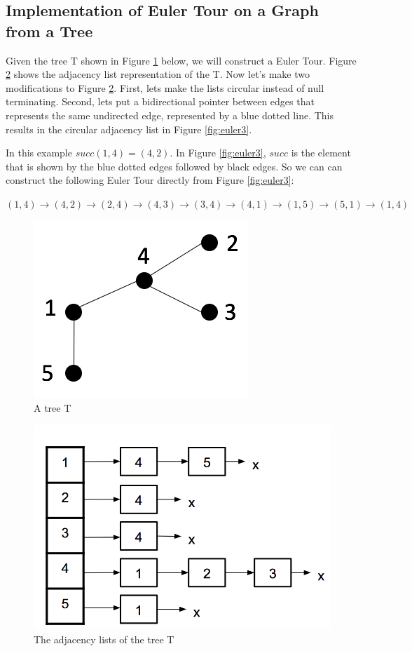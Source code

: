 \documentclass[twoside]{article}
\begin{document}
\subsection{Implementation of Euler Tour on a Graph from a Tree} 

Given the tree T shown in Figure \ref{fig:euler1} below, we will construct a Euler Tour.  Figure \ref{fig:euler2} shows the adjacency list representation of the T.  Now let's make two modifications to Figure \ref{fig:euler2}.  First, lets make the lists circular instead of null terminating.  Second, lets put a bidirectional pointer between edges that represents the same undirected edge, represented by a blue dotted line.  This results in the circular adjacency list in Figure \ref{fig:euler3}. 

In this example $succ(1,4) = (4,2)$.  In Figure \ref{fig:euler3}, $succ$ is the element that is shown by the blue dotted edges followed by black edges.  So we can can construct the following Euler Tour directly from Figure \ref{fig:euler3}:

$(1, 4) \rightarrow (4, 2) \rightarrow (2, 4) \rightarrow (4, 3) \rightarrow (3, 4) \rightarrow (4, 1) \rightarrow (1, 5) \rightarrow (5, 1) \rightarrow (1, 4)$

\begin{figure}[!ht]
\centering
\includegraphics[scale=0.6]{img/EulerCkt1.png}
\caption{A tree T} \label{fig:euler1} 
\end{figure}

\begin{figure}[!ht]
\centering
\includegraphics[scale=0.4]{img/EulerCkt2.png}
\caption{The adjacency lists of the tree T} \label{fig:euler2} 
\end{figure}
\end{document}
